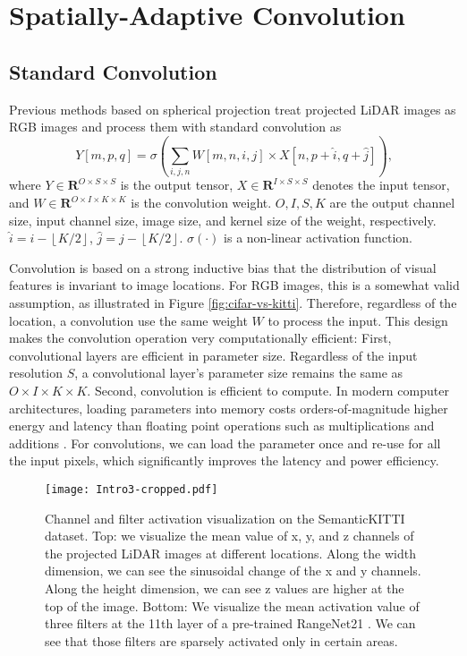 \documentclass[runningheads]{llncs}
\begin{document}
\section{Spatially-Adaptive Convolution}
\subsection{Standard Convolution}
Previous methods based on spherical projection \cite{wu2017squeezeseg,wu2018squeezesegv2,milioto2019rangenet++} treat projected LiDAR images as RGB images and process them with standard convolution as
\begin{equation}
    Y[m, p, q] = \sigma(\sum_{i,j,n} W[m,n,i,j] \times X[n,p + \hat{i}, q+\hat{j}]),
    \label{eqn:conv}
\end{equation}
where $Y \in \mathbf{R}^{O \times S \times S}$ is the output tensor, $X \in \mathbf{R}^{I\times S \times S}$ denotes the input tensor, and $W \in \mathbf{R}^{O\times I\times K\times K}$ is the convolution weight. $O, I, S, K$ are the output channel size, input channel size, image size, and kernel size of the weight, respectively. $\hat{i} = i - \left \lfloor{K / 2}\right \rfloor $, $\hat{j} = j - \left \lfloor{K / 2}\right \rfloor.$ $\sigma(\cdot)$ is a non-linear activation function. 

Convolution is based on a strong inductive bias that the distribution of visual features is invariant to image locations. For RGB images, this is a somewhat valid assumption, as illustrated in Figure \ref{fig:cifar-vs-kitti}. Therefore, regardless of the location, a convolution use the same weight $W$ to process the input. This design makes the convolution operation very computationally efficient: First, convolutional layers are efficient in parameter size. Regardless of the input resolution $S$, a convolutional layer's parameter size remains the same as $O \times I \times K \times K$. Second, convolution is efficient to compute. In modern computer architectures, loading parameters into memory costs orders-of-magnitude higher energy and latency than floating point operations such as multiplications and additions 
\cite{pedram2016dark}. 
For convolutions, we can load the parameter once and re-use for all the input pixels, which significantly improves the latency and power efficiency. 

\begin{figure*}[ht]
\centering
\texttt{[image: Intro3-cropped.pdf]}
\caption{Channel and filter activation visualization on the SemanticKITTI dataset. Top: we visualize the mean value of x, y, and z channels of the projected LiDAR images at different locations. Along the width dimension, we can see the sinusoidal change of the x and y channels. Along the height dimension, we can see z values are higher at the top of the image. Bottom: We visualize the mean activation value of three filters at the 11th layer of a pre-trained RangeNet21 \cite{milioto2019rangenet++}. We can see that those filters are sparsely activated only in certain areas.}
\label{fig:kitti-activation}
\centering
\end{figure*}
\end{document}
